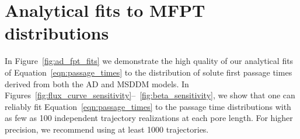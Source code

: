 \documentclass{article}
\begin{document}
%  
%  
  
  \newpage  
  
  \section*{Analytical fits to MFPT distributions}\label{section:mfpt_fits}
  
  In Figure~\ref{fig:ad_fpt_fits} 
  we demonstrate
  the high quality of our analytical fits of Equation~\ref{eqn:passage_times} to 
  the distribution of solute first passage times derived from both the AD
  and MSDDM models. 
  In Figures~\ref{fig:flux_curve_sensitivity}--~\ref{fig:beta_sensitivity}, we
  show that one can reliably fit Equation~\ref{eqn:passage_times}
  to the passage time distributions with as few as 100 independent trajectory
  realizations at each pore length. For higher precision, we recommend using at least
  1000 trajectories.
  
\end{document}
